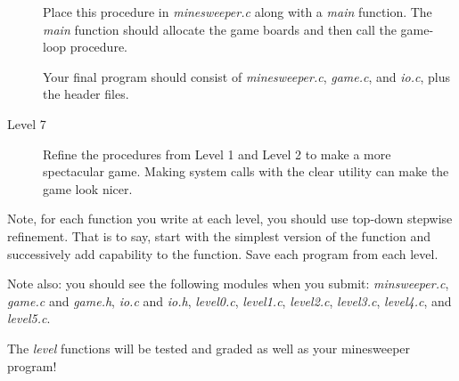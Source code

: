\documentclass{article}
\begin{document}
\begin{description}
    Place this procedure in {\it minesweeper.c}
    along with a 
    {\it main} function. The {\it main}
    function should allocate the game boards
    and then call the game-loop procedure.

    Your final program should consist of {\it minesweeper.c}, {\it game.c},
    and {\it io.c}, plus the header files.

\item[Level 7]
    Refine the procedures
    from Level 1 and Level 2 to make a more spectacular game.
    Making system calls with the clear utility can make the game look nicer.
\end{description}

Note, for each function you write at each level, you should use
top-down stepwise refinement. That is to say, start with the simplest
version of the function and successively add capability to the function.
Save each program from each level.

Note also: you should see the following modules when you submit:
{\it minsweeper.c},
{\it game.c} and {\it game.h},
{\it io.c} and {\it io.h},
{\it level0.c},
{\it level1.c},
{\it level2.c},
{\it level3.c},
{\it level4.c},
and {\it level5.c}.

The {\it level} functions will be tested and graded as well as your
minesweeper program!
\end{document}
